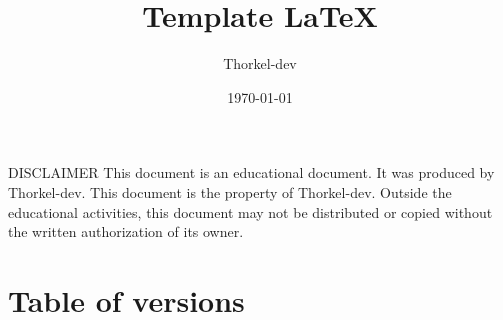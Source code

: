 \documentclass[a4paper,11pt,titlepage]{article}
\author{Thorkel-dev}        %
\title{Template \LaTeX}     %
\date{\normalsize\today}    %
\begin{document}
\maketitle

\BgThispage %
\vspace*{\fill}
\noindent
DISCLAIMER \newline
This document is an educational document. It was produced by Thorkel-dev.
This document is the property of Thorkel-dev. Outside the educational activities, this document
may not be distributed or copied without the written authorization of its owner.
\vspace*{\fill}
\clearpage

\section*{Table of versions}
 \label{TableOfVersion} %
\clearpage

\tableofcontents %







\printglossary[type=\acronymtype] \label{acronyms}
\glsaddallunused %

\printglossary[] \label{domaindictionary} %
\glsaddallunused %

\listoffigures \label{TableOfFigure} %

\listoflistings \label{TableOfCode} %

\printbibliography[heading=bibnumbered, label=bibliography] %
\nocite{*} %

\clearpage
\null
\thispagestyle{empty}%
\addtocounter{page}{-1}%
\BgThispage
\end{document}

